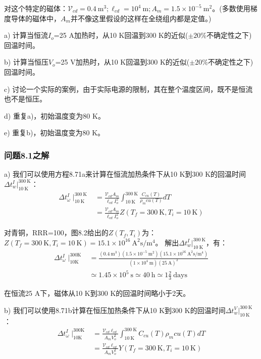 对这个特定的磁体：$\mathcal{V}_{cd}=0.4\ \mathrm{m^3};\ell_{cd}=10^4\ \mathrm{m};A_m=1.5\times 10^{-5}\ \mathrm{m^2}$。(多数使用梯度导体的磁体中，$A_m$并不像这里假设的这样在全绕组内都是定值。)

a) 计算当恒流$I_o$=25 A加热时，从10 K回温到300 K的近似($\pm 20\%$不确定性之下)回温时间。

b) 计算当恒压$V_o$=25 V加热时，从10 K回温到300 K的近似($\pm 20\%$不确定性之下)回温时间。

c) 讨论一个实际的案例，由于实际电源的限制，其在整个温度区间，既不是恒流也不是恒压。

d) 重复a)，初始温度变为80 K。

e) 重复b)，初始温度变为80 K。

\subsubsection{问题8.1之解}
a) 我们可以使用方程8.71a来计算在恒流加热条件下从10 K到300 K的回温时间$\Delta t_w^I|_{10\ \mathrm{K}}^{300\ \mathrm{K}}$：
\begin{align*}%
\Delta t_{\omega}^{I}\mid_{10\ \mathrm{K}}^{300\ \mathrm{K}}&=\frac{\mathcal{V}_{cd}A_m}{\ell_{cd}I_{o}^{2}}\int_{10\ \mathrm{K}}^{300\ \mathrm{K}}\frac{C_{cu}(T)}{\rho_m{cu}(T)}dT \\
&=\frac{\mathcal{V}_{cd}A_m}{\ell_{cd}I_{o}^{2}}Z(T_f=300\ \mathrm{K},T_i=10\ \mathrm{K}) \tag{S1.1}
\end{align*}

对青铜，RRR=100，图8.2给出的$Z(T_f,T_i)$为：
$Z(T_f=300\ \mathrm{K},T_i=10\ \mathrm{K})=15.1\times 10^{16}\ \mathrm{A^2 s/m^4}$。
解出$\Delta t_w^I|_{10\ \mathrm{K}}^{300\ \mathrm{K}}$，有：
\begin{align*}%
\Delta t_{\omega}^{I}\mid_{10\mathrm{K}}^{300\mathrm{K}}&=\frac{(0.4\ \mathrm{m^3})(1.5\times 10^{-5}\ \mathrm{m^2})(15.1\times 10^{16}\ \mathrm{A^2s/m^4})}{(1\times 10^4\ \mathrm{m})(25\ \mathrm{A})^2} \\
&\simeq 1.45\times 10^5\ \mathrm{s}\simeq 40\ \mathrm{h}\simeq 1\frac{2}{3}\ \mathrm{days}  \tag{S1.2}
\end{align*}

在恒流25 A下，磁体从10 K到300 K的回温时间略小于2天。

b) 我们可以使用8.71b计算在恒压加热条件下从10 K到300 K的回温时间$\Delta t_w^V|_{10\ \mathrm{K}}^{300\ \mathrm{K}}$：
\begin{align*}%
\Delta t_{\omega}^{I}\mid_{10\mathrm{K}}^{300\mathrm{K}}&=\frac{\mathcal{V}_{cd}\ell_{cd}}{A_mV_{o}^{2}}\int_{10\ \mathrm{K}}^{300\ \mathrm{K}}C_{cu}(T)\rho_m{cu}(T)dT \\
&=\frac{\mathcal{V}_{cd}\ell_{cd}}{A_mV_{o}^{2}}Y(T_f=300\ \mathrm{K},T_i=10\ \mathrm{K})\tag{S1.3}
\end{align*}

